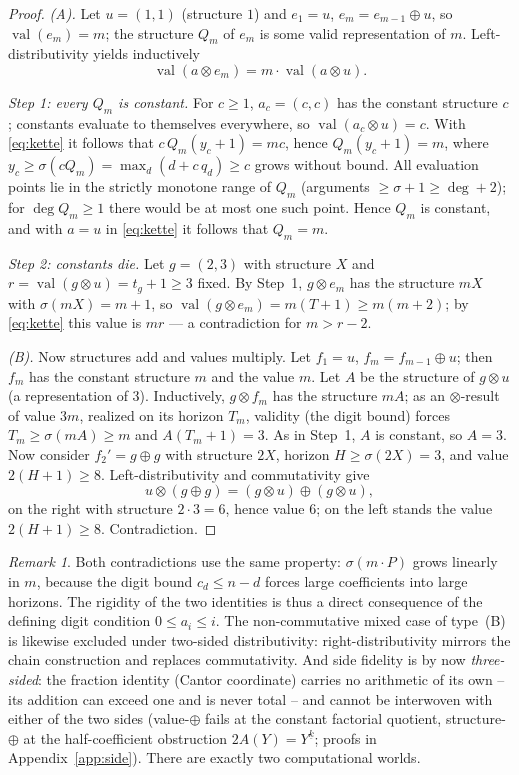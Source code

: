 \documentclass[11pt]{article}
\theoremstyle{definition}
\theoremstyle{remark}
\newtheorem{bemerkung}[satz]{Remark}
\newcommand{\val}{\operatorname{val}}
\begin{document}
\begin{proof}
\emph{(A).} Let $u=(1,1)$ (structure $1$) and $e_1=u$,
$e_m=e_{m-1}\oplus u$, so $\val(e_m)=m$; the structure $Q_m$ of
$e_m$ is some valid representation of $m$.
Left-distributivity yields inductively
\begin{equation}\label{eq:kette}
\val(a\otimes e_m)=m\cdot\val(a\otimes u).
\end{equation}

\emph{Step 1: every $Q_m$ is constant.} For $c\ge1$, $a_c=(c,c)$
has the constant structure $c$; constants evaluate to themselves
everywhere, so $\val(a_c\otimes u)=c$. With \eqref{eq:kette} it
follows that $c\,Q_m(y_c{+}1)=mc$, hence $Q_m(y_c{+}1)=m$, where
$y_c\ge\sigma(cQ_m)=\max_d(d+c\,q_d)\ge c$ grows without bound. All
evaluation points lie in the strictly monotone range of $Q_m$
(arguments $\ge\sigma+1\ge\deg+2$); for $\deg Q_m\ge1$ there would
be at most one such point. Hence $Q_m$ is constant, and with
$a=u$ in \eqref{eq:kette} it follows that $Q_m=m$.

\emph{Step 2: constants die.} Let $g=(2,3)$ with structure
$X$ and $r=\val(g\otimes u)=t_g{+}1\ge3$ fixed. By Step~1,
$g\otimes e_m$ has the structure $mX$ with $\sigma(mX)=m{+}1$, so
$\val(g\otimes e_m)=m(T{+}1)\ge m(m{+}2)$; by \eqref{eq:kette}
this value is $mr$ --- a contradiction for $m>r-2$.

\emph{(B).} Now structures add and values multiply. Let $f_1=u$,
$f_m=f_{m-1}\oplus u$; then $f_m$ has the constant structure $m$
and the value $m$. Let $A$ be the structure of
$g\otimes u$ (a representation of $3$). Inductively, $g\otimes f_m$
has the structure $mA$; as an $\otimes$-result of value $3m$,
realized on its horizon $T_m$, validity (the digit bound) forces
$T_m\ge\sigma(mA)\ge m$ and $A(T_m{+}1)=3$. As in Step~1,
$A$ is constant, so $A=3$. Now consider $f_2'=g\oplus g$ with
structure $2X$, horizon $H\ge\sigma(2X)=3$, and value
$2(H{+}1)\ge8$. Left-distributivity and commutativity give
\[
u\otimes(g\oplus g)=(g\otimes u)\oplus(g\otimes u),
\]
on the right with structure $2\cdot3=6$, hence value $6$; on the
left stands the value $2(H{+}1)\ge8$. Contradiction.
\end{proof}

\begin{bemerkung}
Both contradictions use the same property:
$\sigma(m\cdot P)$ grows linearly in $m$, because the digit bound
$c_d\le n-d$ forces large coefficients into large horizons. The
rigidity of the two identities is thus a direct consequence of the
defining digit condition $0\le a_i\le i$. The non-commutative mixed
case of type~(B) is likewise excluded under two-sided
distributivity: right-distributivity mirrors the chain
construction and replaces commutativity. And side fidelity is by
now \emph{three-sided}: the fraction identity (Cantor coordinate)
carries no arithmetic of its own -- its addition can exceed one and
is never total -- and cannot be interwoven with either of the two
sides (value-$\oplus$ fails at the constant factorial quotient,
structure-$\oplus$ at the half-coefficient obstruction
$2A(Y)=Y^{\underline k}$; proofs in
Appendix~\ref{app:side}).
There are exactly two computational worlds.
\end{bemerkung}
\end{document}
